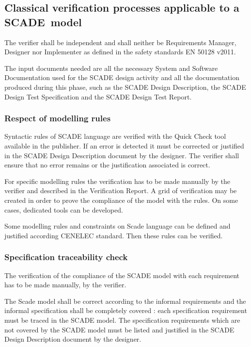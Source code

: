 \subsection{Classical verification processes applicable to a SCADE~model}

The verifier shall be independent and shall neither be Requirements Manager, Designer nor Implementer as defined in the safety standards EN 50128 v2011.

The input documents needed are all the necessary System and Software Documentation used for the SCADE design activity and all the documentation produced during this phase, such as the SCADE Design Description, the SCADE Design Test Specification and the SCADE Design Test Report.

\subsubsection{Respect of modelling rules}

Syntactic rules of SCADE language are verified with the Quick Check tool available in the publisher. If an error is detected it must be corrected or justified in the SCADE Design Description document by the designer. The verifier shall ensure that no error remains or the justification associated is correct.

For specific modelling rules the verification has to be made manually by the verifier and described in the Verification Report. A grid of verification may be created in order to prove the compliance of the model with the rules. On some cases, dedicated tools can be developed.

Some modelling rules and constraints on Scade language can be defined and justified according CENELEC standard. Then these rules can be verified.

\subsubsection{Specification traceability check}

The verification of the compliance of the SCADE model with each requirement has to be made manually, by the verifier. 

The Scade model shall be correct according to the informal requirements and the informal specification shall be completely covered : each specification requirement must be traced in the SCADE model. The specification requirements which are not covered by the SCADE model must be listed and justified in the SCADE Design Description document by the designer.

